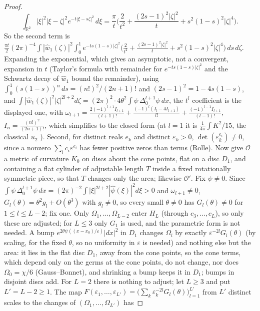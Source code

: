\documentclass[pdflatex,sn-mathphys-num]{sn-jnl}
\theoremstyle{thmstyleone}%
\theoremstyle{thmstylethree}%
\newcommand{\Orb}{\mathcal{O}}
\newcommand{\R}{\mathbb{R}}
\begin{document}
\begin{proof}
\[
\int_{\R^2}|\xi|^2|\xi-\zeta|^2e^{-t|\xi-s\zeta|^2}\,d\xi=\frac\pi t\Big(\frac2{t^2}+\frac{(2s-1)^2|\zeta|^2}t+s^2(1-s)^2|\zeta|^4\Big).
\]
So the second term is $\frac{\pi t}2(2\pi)^{-4}\int|\hat w_1(\zeta)|^2\int_0^1e^{-ts(1-s)|\zeta|^2}\big(\frac2{t^2}+\frac{(2s-1)^2|\zeta|^2}t+s^2(1-s)^2|\zeta|^4\big)\,ds\,d\zeta$. Expanding the exponential, which gives an asymptotic, not a convergent, expansion in $t$ (Taylor's formula with remainder for $e^{-ts(1-s)|\zeta|^2}$ and the Schwartz decay of $\hat w_1$ bound the remainder), using $\int_0^1(s(1-s))^n\,ds=(n!)^2/(2n+1)!$ and $(2s-1)^2=1-4s(1-s)$, and $\int|\hat w_1(\zeta)|^2|\zeta|^{2l+2}d\zeta=(2\pi)^2\cdot4\theta^2\int\psi\,\Delta_0^{l+1}\psi\,dx$, the $t^l$ coefficient is the displayed one, with $\omega_{l+1}=\frac{2(-1)^{l+1}I_{l+1}}{(l+1)!}+\frac{(-1)^l(I_l-4I_{l+1})}{l!}+\frac{(-1)^{l-1}I_{l+1}}{(l-1)!}$, $I_n=\frac{(n!)^2}{(2n+1)!}$, which simplifies to the closed form (at $l=1$ it is $\frac1{4\pi}\int K^2/15$, the classical $u_2$ \cite[(2.4)]{schueth2019}). Second, for distinct reals $e_k$ and distinct $\varepsilon_k>0$, $\det(\varepsilon_k^{e_i})\ne0$, since a nonzero $\sum_ic_i\varepsilon^{e_i}$ has fewer positive zeros than terms (Rolle). Now give $\Orb$ a metric of curvature $K_0$ on discs about the cone points, flat on a disc $D_1$, and containing a flat cylinder of adjustable length $T$ inside a fixed rotationally symmetric piece, so that $T$ changes only the area; likewise $\Orb'$. Fix $\psi\ne0$. Since $\int\psi\,\Delta_0^{l+1}\psi\,dx=(2\pi)^{-2}\int|\xi|^{2l+2}|\hat\psi(\xi)|^2d\xi>0$ and $\omega_{l+1}\ne0$, $G_l(\theta)=\theta^2g_l+O(\theta^3)$ with $g_l\ne0$, so every small $\theta\ne0$ has $G_l(\theta)\ne0$ for $1\le l\le L-2$; fix one. Only $\Omega_1,\dots,\Omega_{L-2}$ enter $H_L$ (through $c_3,\dots,c_L$), so only these are adjusted; for $L\le3$ only $G_1$ is used, and the parametric form is not needed. A bump $e^{2\theta\psi((x-x_0)/\varepsilon)}|dx|^2$ in $D_1$ changes $\Omega_l$ by exactly $\varepsilon^{-2l}G_l(\theta)$ (by scaling, for the fixed $\theta$, so no uniformity in $\varepsilon$ is needed) and nothing else but the area: it lies in the flat disc $D_1$, away from the cone points, so the cone terms, which depend only on the germs at the cone points, do not change, nor does $\Omega_0=\chi/6$ (Gauss--Bonnet), and shrinking a bump keeps it in $D_1$; bumps in disjoint discs add. For $L=2$ there is nothing to adjust; let $L\ge3$ and put $L'=L-2\ge1$. The map $F(\varepsilon_1,\dots,\varepsilon_{L'})=\bigl(\sum_k\varepsilon_k^{-2l}G_l(\theta)\bigr)_{l=1}^{L'}$ from $L'$ distinct scales to the changes of $(\Omega_1,\dots,\Omega_{L'})$ has

\end{proof}
\end{document}
